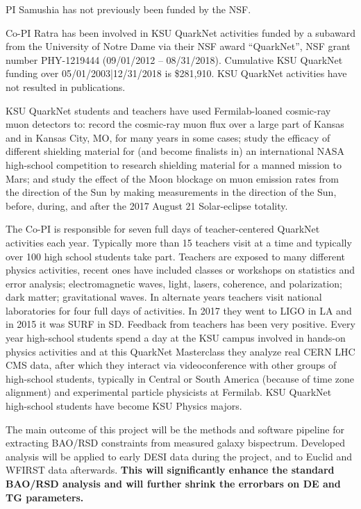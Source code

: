 
PI Samushia has not previously been funded by the NSF.

Co-PI Ratra has been involved in  KSU QuarkNet activities funded by a subaward
from the University of Notre Dame via their NSF award ``QuarkNet'', NSF grant
number PHY-1219444 (09/01/2012 -- 08/31/2018).  Cumulative KSU QuarkNet funding
over 05/01/2003|12/31/2018 is \$281,910. KSU QuarkNet activities have not
resulted in publications. 

KSU QuarkNet students and teachers have used Fermilab-loaned cosmic-ray muon
detectors to: record the cosmic-ray muon flux over a large part of Kansas and
in Kansas City, MO, for many years in some cases; study the efficacy of
different shielding material for (and become finalists in) an international
NASA high-school competition to research shielding material for a manned
mission to Mars; and study the effect of the Moon blockage on muon emission
rates from the direction of the Sun by making measurements in the direction of
the Sun, before, during, and after the 2017 August 21 Solar-eclipse totality.

The Co-PI is responsible for seven full days of teacher-centered QuarkNet
activities each year. Typically more than 15 teachers visit at a time and
typically over 100 high school students take part. Teachers are exposed to many
different physics activities, recent ones have included classes or workshops on
statistics and error analysis; electromagnetic waves, light, lasers, coherence,
and polarization; dark matter; gravitational waves.  In alternate years
teachers visit national laboratories for four full days of activities. In 2017
they went to LIGO in LA and in 2015 it was SURF in SD.  Feedback from teachers
has been very positive. Every year high-school students spend a day at the KSU
campus involved in hands-on physics activities and at this QuarkNet Masterclass
they analyze real CERN LHC CMS data, after which they interact via
videoconference with other groups of high-school students, typically in
Central or South America (because of time zone alignment) and experimental
particle physicists at Fermilab. KSU QuarkNet high-school students have become
KSU Physics majors. 



The main outcome of this project will be the methods and software pipeline for
extracting BAO/RSD constraints from measured galaxy bispectrum. Developed
analysis will be applied to early DESI data during the project, and to Euclid
and WFIRST data afterwards. \textbf{This will significantly enhance the
standard BAO/RSD analysis and will further shrink the errorbars on DE and TG
parameters.}

